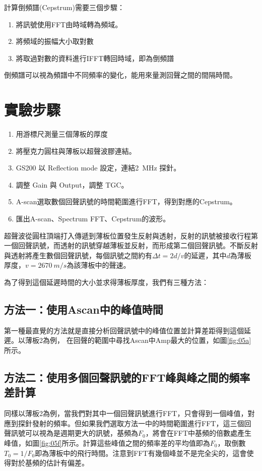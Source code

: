 \documentclass[12pt]{report}
\begin{document}
計算倒頻譜(Cepstrum)需要三個步驟：
\begin{enumerate}
    \item 將訊號使用FFT由時域轉為頻域。
    \item 將頻域的振幅大小取對數
    \item 將取過對數的資料進行IFFT轉回時域，即為倒頻譜
\end{enumerate}
倒頻譜可以視為頻譜中不同頻率的變化，能用來量測回聲之間的間隔時間。

\section{實驗步驟}

\begin{enumerate}
\item 用游標尺測量三個薄板的厚度
\item 將壓克力圓柱與薄板以超聲波膠連結。
\item GS200 以 Reflection mode 設定，連結\SI{2}{MHz} 探針。
\item 調整 Gain 與 Output，調整 TGC。
\item A-scan選取數個回聲訊號的時間範圍進行FFT，得到對應的Cepstrum。
\item 匯出A-scan、Spectrum FFT、Cepstrum的波形。
\end{enumerate}

超聲波從圓柱頂端打入傳遞到薄板位置發生反射與透射，反射的訊號被接收行程第一個回聲訊號，而透射的訊號穿越薄板並反射，而形成第二個回聲訊號。不斷反射與透射將產生數個回聲訊號，每個訊號之間約有$\Delta t = 2d/v$的延遲，其中$d$為薄板厚度，$v=\SI{2670}{m/s}$為該薄板中的聲速。

為了得到這個延遲時間的大小並求得薄板厚度，我們有三種方法：

\subsection{方法一：使用Ascan中的峰值時間}

第一種最直覺的方法就是直接分析回聲訊號中的峰值位置並計算差距得到這個延遲。以薄板2為例，
在回聲的範圍中尋找Ascan中Amp最大的位置，如圖\ref{fig:05a}所示。

\subsection{方法二：使用多個回聲訊號的FFT峰與峰之間的頻率差計算}

同樣以薄板2為例，當我們對其中一個回聲訊號進行FFT，只會得到一個峰值，對應到探針發射的頻率。但如果我們選取方法一中的時間範圍進行FFT，這三個回聲訊號可以視為是週期更大的訊號，基頻為$F_0$，將會在FFT中基頻的倍數處產生峰值，如圖\ref{fig:05f}所示。計算這些峰值之間的頻率差的平均值即為$F_0$，取倒數$T_0=1/F_0$即為薄板中的飛行時間。注意到FFT有幾個峰並不是完全尖的，這會使得對於基頻的估計有偏差。
\end{document}
